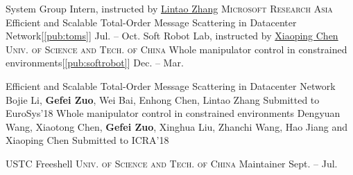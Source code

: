 \documentclass[10pt,a4paper]{article}
\begin{document}
\headedsection
{System Group Intern, instructed by \href{https://www.microsoft.com/en-us/research/people/lintaoz/}{Lintao Zhang}}
{\textsc{Microsoft Research Asia}}
{
	\headedsubsection
	{Efficient and Scalable Total-Order Message Scattering in Datacenter Network[\ref{pub:toms}]}
	{Jul. -- Oct.}
	{}
}
\headedsection
{Soft Robot Lab, instructed by \href{http://ai.ustc.edu.cn/}{Xiaoping Chen}}
{\textsc{Univ. of Science and Tech. of China}}
{
	\headedsubsection
	{Whole manipulator control in constrained environments[\ref{pub:softrobot}]}
	{Dec. -- Mar.}
	{}
}

\spacedhrule{0.2em}{-1em}
\publication
	{Efficient and Scalable Total-Order Message Scattering in Datacenter Network\label{pub:toms}}
	{Bojie Li, \textbf{Gefei Zuo}, Wei Bai, Enhong Chen, Lintao Zhang}
	{Submitted to EuroSys'18}
\publication
	{Whole manipulator control in constrained environments\label{pub:softrobot}}
	{Dengyuan Wang, Xiaotong Chen, \textbf{Gefei Zuo}, Xinghua Liu, Zhanchi Wang, Hao Jiang and Xiaoping Chen}
	{Submitted to ICRA'18}
\spacedhrule{0.5em}{-1em}


\headedsection  %
{USTC Freeshell}
{\textsc{Univ. of Science and Tech. of China}} {
	\headedsubsection
	{Maintainer}
	{Sept. -- Jul.}
	{}
	}
\end{document}
